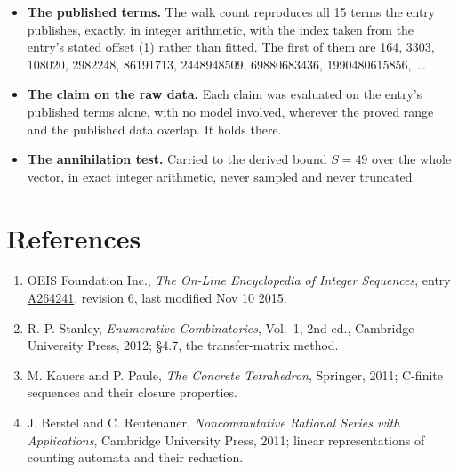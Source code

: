 \documentclass[11pt]{article}
\theoremstyle{definition}
\begin{document}
\begin{itemize}

\item {\bfseries The published terms.} The walk count reproduces all 15 terms the entry publishes, exactly, in integer arithmetic, with the index taken from the entry's stated offset (1) rather than fitted. The first of them are 164, 3303, 108020, 2982248, 86191713, 2448948509, 69880683436, 1990480615856,~\dots

\item {\bfseries The claim on the raw data.} Each claim was evaluated on the entry's published terms alone, with no model involved, wherever the proved range and the published data overlap. It holds there.

\item {\bfseries The annihilation test.} Carried to the derived bound $S = 49$ over the whole vector, in exact integer arithmetic, never sampled and never truncated.

\end{itemize}

\section{References}

\begin{enumerate}

\item OEIS Foundation Inc., \emph{The On-Line Encyclopedia of Integer Sequences}, entry \href{https://oeis.org/A264241}{A264241}, revision 6, last modified Nov 10 2015.

\item R. P. Stanley, \emph{Enumerative Combinatorics}, Vol.~1, 2nd ed., Cambridge University Press, 2012; \S4.7, the transfer-matrix method.

\item M. Kauers and P. Paule, \emph{The Concrete Tetrahedron}, Springer, 2011; C-finite sequences and their closure properties.

\item J. Berstel and C. Reutenauer, \emph{Noncommutative Rational Series with Applications}, Cambridge University Press, 2011; linear representations of counting automata and their reduction.

\end{enumerate}
\end{document}
